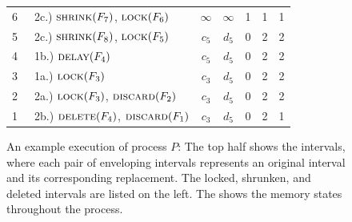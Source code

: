 \begin{figure}
\begin{tabular}{cl|ccccc}
    6 & \ 2c.) $\textsc{shrink}(F_7)$, $\textsc{lock}(F_6)$ & $\infty$ & $\infty$ & 1 & 1 & 1\\
    5 & \ 2c.) $\textsc{shrink}(F_8)$, $\textsc{lock}(F_5)$ & $c_5$ & $d_5$ & 0 & 2 & 2\\
    4 & \ 1b.) $\textsc{delay}(F_4)$ & $c_5$ & $d_5$ & 0 & 2 & 2\\
    3 & \ 1a.) $\textsc{lock}(F_3)$ & $c_3$ & $d_5$ & 0 & 2 & 2\\
    2 & \ 2a.) $\textsc{lock}(F_3)$, $\textsc{discard}(F_2)$ & $c_3$ & $d_5$ & 0 & 2 & 2\\
    1 & \ 2b.) $\textsc{delete}(F_4)$, $\textsc{discard}(F_1)$ & $c_3$ & $d_5$ & 0 & 2 & 1\\
\end{tabular}
\color{black}
\caption{An example execution of process $P$: The top half shows the intervals, where each pair of enveloping intervals represents an original interval and its corresponding replacement. The locked, shrunken, and deleted intervals are listed on the left. The  shows the memory states  throughout the process.}
\label{fig:ham_path}
\end{figure}



